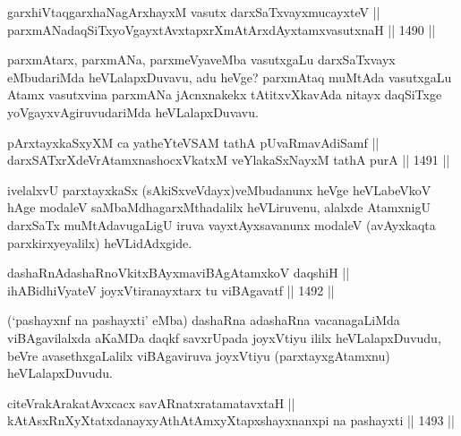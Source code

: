 \begin{shl}
garxhiVtaqgarxhaNagArxhayxM vasutx darxSaTxvayxmucayxteV || \\
parxmANadaqSiTxyoVgayxtAvxtapxrXmAtArxdAyxtamxvasutxnaH ||  1490 ||  
\end{shl}

\begin{artha}
parxmAtarx, parxmANa, parxmeVyaveMba vasutxgaLu darxSaTxvayx eMbudariMda heVLalapxDuvavu, adu heVge? parxmAtaq muMtAda vasutxgaLu Atamx vasutxvina parxmANa jAcnxnakekx tAtitxvXkavAda nitayx daqSiTxge yoVgayxvAgiruvudariMda heVLalapxDuvavu.
\end{artha}

\begin{shl}
pArxtayxkaSxyXM ca yatheYteVSAM tathA pUvaRmavAdiSamf ||  \\
darxSATxrXdeVrAtamxnashocxVkatxM veYlakaSxNayxM tathA purA ||  1491 ||  
\end{shl}

\begin{artha}
ivelalxvU parxtayxkaSx (sAkiSxveVdayx)veMbudanunx heVge heVLabeVkoV hAge modaleV saMbaMdhagarxMthadalilx heVLiruvenu, alalxde AtamxnigU darxSaTx muMtAdavugaLigU iruva vayxtAyxsavanunx modaleV (avAyxkaqta parxkirxyeyalilx) heVLidAdxgide.
\end{artha}


\begin{shl}
dashaRnAdashaRnoVkitxBAyxmaviBAgAtamxkoV daqshiH || \\
ihABidhiVyateV joyxVtiranayxtarx tu viBAgavatf ||  1492 ||  
\end{shl}

\begin{artha}
(`pashayxnf na pashayxti' eMba) dashaRna adashaRna vacanagaLiMda viBAgavilalxda aKaMDa daqkf savxrUpada joyxVtiyu ililx heVLalapxDuvudu, beVre avasethxgaLalilx viBAgaviruva joyxVtiyu (parxtayxgAtamxnu) heVLalapxDuvudu.
\end{artha}


\begin{shl}
\footnotemark[1]citeVrakArakatAvxcacx savARnatxratamatavxtaH || \\
\footnotemark[2]kAtAsxRnXyXtatxdanayxyAthAtAmxyXtapxshayxnanxpi na pashayxti ||  1493 ||  
\end{shl}
		
